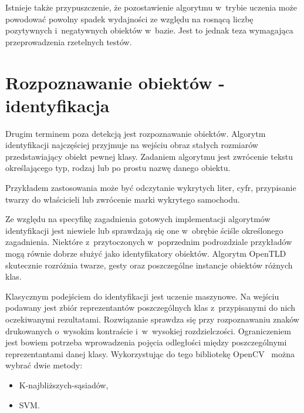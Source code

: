 Istnieje także przypuszczenie, że pozostawienie algorytmu w~trybie uczenia
może powodować powolny spadek wydajności ze względu na rosnącą liczbę
pozytywnych i~negatywnych obiektów w~bazie. Jest to jednak teza wymagająca
przeprowadzenia rzetelnych testów.

\section{Rozpoznawanie obiektów - identyfikacja}

Drugim terminem poza detekcją jest rozpoznawanie obiektów. Algorytm
identyfikacji najczęściej przyjmuje na wejściu obraz stałych rozmiarów
przedstawiający obiekt pewnej klasy. Zadaniem algorytmu jest zwrócenie
tekstu określającego typ, rodzaj lub po prostu nazwę danego obiektu.

Przykładem zastosowania może być odczytanie wykrytych liter,
cyfr, przypisanie twarzy do właścicieli lub zwrócenie marki wykrytego
samochodu.

Ze względu na specyfikę zagadnienia gotowych implementacji algorytmów
identyfikacji jest niewiele lub sprawdzają się one w~obrębie
ściśle określonego zagadnienia. Niektóre z~przytoczonych w~poprzednim
podrozdziale przykładów mogą równie dobrze służyć jako identyfikatory
obiektów. Algorytm OpenTLD skutecznie rozróżnia twarze, gesty oraz
poszczególne instancje obiektów różnych klas.

Klasycznym podejściem do identyfikacji jest uczenie maszynowe. Na
wejściu podawany jest zbiór reprezentantów poszczególnych klas
z~przypisanymi do nich oczekiwanymi rezultatami. Rozwiązanie
sprawdza się przy rozpoznawaniu znaków drukowanych o~wysokim
kontraście i~w~wysokiej rozdzielczości. Ograniczeniem jest bowiem
potrzeba wprowadzenia pojęcia odległości między poszczególnymi
reprezentantami danej klasy. Wykorzystując do tego bibliotekę
OpenCV \ można wybrać dwie metody:

\begin{itemize}
\item K-najbliższych-sąsiadów,
\item SVM.
\end{itemize}

